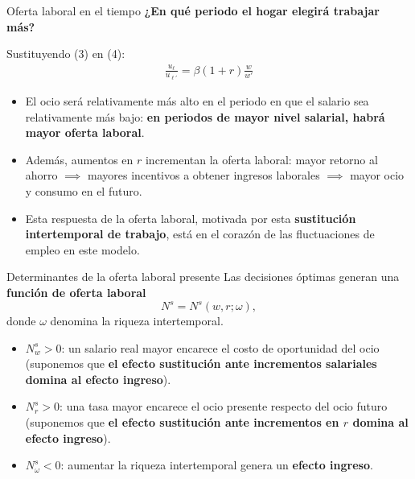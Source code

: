 \documentclass[aspectratio=169,11pt]{beamer}
\begin{document}
\begin{frame}{Oferta laboral en el tiempo}
  \textbf{¿En qué periodo el hogar elegirá trabajar más?}
  
  \vspace{.2cm}

  Sustituyendo (3) en (4):
  \begin{align*}
    \frac{u_\ell}{u_{\ell'}} = \beta(1+r) \frac{w}{w'}
  \end{align*}
  \begin{itemize}
    \small
    \item El ocio será relativamente más alto en el periodo en que el salario sea relativamente más bajo: \textbf{en periodos de mayor nivel salarial, habrá mayor oferta laboral}.
    \item Además, aumentos en $r$ incrementan la oferta laboral: mayor retorno al ahorro $\implies$ mayores incentivos a obtener ingresos laborales $\implies$ mayor ocio y consumo en el futuro.
    \item Esta respuesta de la oferta laboral, motivada por esta \textbf{sustitución intertemporal de trabajo}, está en el corazón de las fluctuaciones de empleo en este modelo.
  \end{itemize}
\end{frame}


\begin{frame}{Determinantes de la oferta laboral presente}
  Las decisiones óptimas generan una \textbf{función de oferta laboral}
  \[
    N^s=N^s(w, r; \omega),
  \]
  donde \(\omega\) denomina la riqueza intertemporal.
  \begin{itemize}
    \setlength{\itemsep}{0.5em}
    \item \(N^s_w>0\): un salario real mayor encarece el costo de oportunidad del ocio (suponemos que \textbf{el efecto sustitución ante incrementos salariales domina al efecto ingreso}).
    \item \(N^s_r>0\): una tasa mayor encarece el ocio presente respecto del ocio futuro (suponemos que \textbf{el efecto sustitución ante incrementos en $r$ domina al efecto ingreso}).
    \item \(N^s_\omega<0\): aumentar la riqueza intertemporal genera un \textbf{efecto ingreso}.
  \end{itemize}
\end{frame}
\end{document}
